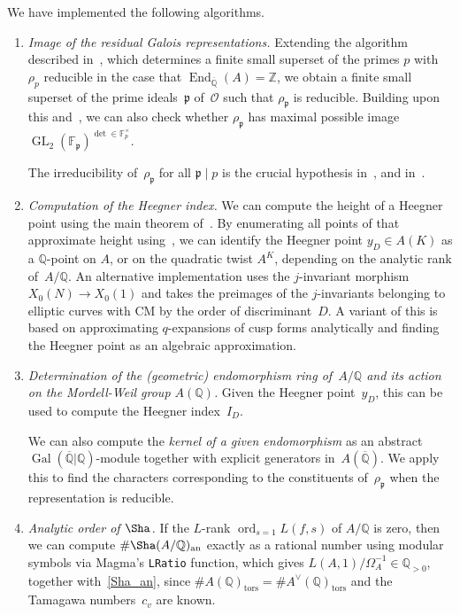 \documentclass{amsart}
\newcommand{\Q}{{\mathbb{Q}}}
\newcommand{\Qbar}{{\overline{\Q}}}
\newcommand{\Z}{{\mathbb{Z}}}
\newcommand{\F}{{\mathbb{F}}}
\newcommand{\pfr}{{\mathfrak{p}}}
\newcommand{\End}{\operatorname{End}}
\newcommand{\GL}{\operatorname{GL}}
\newcommand{\Gal}{\operatorname{Gal}}
\newcommand{\GalQ}{{\Gal(\Qbar|\Q)}}
\newcommand{\Ocal}{{\mathcal{O}}}
\newcommand{\an}{{\mathrm{an}}}
\newcommand{\tors}{{\mathrm{tors}}}
\newcommand{\ord}{\operatorname{ord}}
\begin{document}
	We have implemented the following algorithms.
	\begin{enumerate}
		\item \emph{Image of the residual Galois representations.}
		Extending the algorithm described in~\cite{Dieulefait2002}, which determines
		a finite small superset of the primes $p$ with $\rho_p$ reducible in the
		case that $\End_\Qbar(A) = \Z$, we obtain a finite small superset of the
		prime ideals~$\pfr$ of~$\Ocal$ such that $\rho_\pfr$ is reducible. Building
		upon this and~\cite{Cojocaru2005}, we can also check whether $\rho_\pfr$
		has maximal possible image $\GL_2(\F_\pfr)^{\det \in \F_p^\times}$.
		
		The irreducibility of~$\rho_\pfr$ for all $\pfr \mid p$ is the crucial
		hypothesis in~\cite[Theorems~C and~D]{CCSS}, and
		in~\cite{KolyvaginLogachev}.
		
		\item \emph{Computation of the Heegner index.} %
		We can compute the height of a Heegner point using the main theorem
		of~\cite{GrossZagier1986}. By enumerating all points of that approximate height using~\cite{MuellerStoll2016b}, we can identify the Heegner point $y_D \in A(K)$
		as a $\Q$-point on $A$, or on the quadratic twist $A^K$, depending on the
		analytic rank of~$A/\Q$. An alternative implementation uses the $j$-invariant
		morphism $X_0(N) \to X_0(1)$ and takes the preimages of the $j$-invariants
		belonging to elliptic curves with CM by the order of discriminant~$D$.
		A variant of this is based on approximating $q$-expansions of cusp forms
		analytically and finding the Heegner point as an algebraic approximation.
		
		\item \label{End}
		\emph{Determination of the (geometric) endomorphism ring of~$A/\Q$ and its action
			on the Mordell-Weil group $A(\Q)$.} Given the Heegner point~$y_D$, this
		can be used to compute the Heegner index~$I_D$.
		
		We can also compute the \emph{kernel of a given endomorphism} as an abstract
		$\GalQ$-module together with explicit generators in~$A(\Qbar)$.
		We apply this to find the characters corresponding to the constituents
		of~$\rho_\pfr$ when the representation is reducible.
		
		\item \emph{Analytic order of $\Sha$.}
		If the $L$-rank $\ord\nolimits_{s=1}L(f,s)$ of $A/\Q$ is zero, then we can compute
		$\#\Sha(A/\Q)_\an$ exactly as a rational number using modular symbols via
		Magma's \verb|LRatio| function, which gives $L(A,1)/\Omega_A^{-1}
		\in \Q_{>0}$,
		together with~\eqref{Sha_an}, since $\#A(\Q)_\tors = \#A^\vee(\Q)_\tors$
		and the Tamagawa numbers~$c_v$ are known.
		

\end{enumerate}
\end{document}
